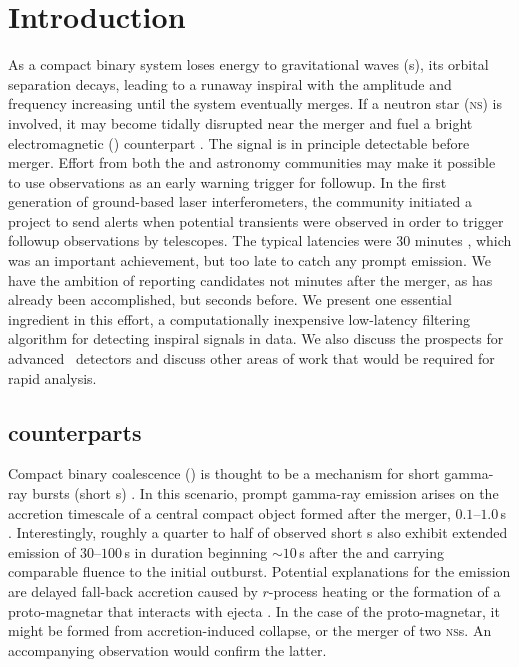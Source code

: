 \section{Introduction}
\label{sec:introduction}

As a compact binary system loses energy to gravitational waves (\GW{}s), its
orbital separation decays, leading to a runaway inspiral with the \GW{}
amplitude and frequency increasing until the system eventually merges.
If a neutron star (\textsc{ns}) is involved, it may become tidally disrupted near
the merger and fuel a bright electromagnetic (\EM{}) counterpart
\citep{shibata:2007}.  The \GW{} signal is in principle detectable
before merger.  Effort from both the \GW{} and astronomy communities may make
it possible to use \GW{} observations as an early warning trigger for \EM{}
followup. In the first generation of ground-based laser interferometers, the \GW{}
community initiated a project to send alerts when potential \GW{} transients
were observed in order to trigger followup observations by \EM{} telescopes.
The typical latencies were 30 minutes \citep{HugheyGWPAW2011}, which was an
important achievement, but too late to catch any prompt \EM{}
emission. We have the ambition of reporting \GW{} candidates not minutes after
the merger, as has already been accomplished, but seconds before.  We present
one essential ingredient in this effort, a computationally inexpensive
low-latency filtering algorithm for detecting inspiral signals in \GW{}
data.  We also discuss the prospects for advanced \GW\ detectors and
discuss other areas of work that would be required for rapid analysis.

\subsection{\EM{} counterparts}

Compact binary coalescence (\CBC) is thought to be a
mechanism for short gamma-ray bursts (short \GRB{}s) \citep{Lee:2005, nakar07}.
In this scenario, prompt gamma-ray emission arises on the accretion timescale
of a central compact object formed after the merger, $0.1$--$1.0$\,s
\citep{Janka1999}.  Interestingly, roughly a quarter to half of observed short
\GRB{}s also exhibit extended emission of $30$--$100$\,s in duration beginning
$\sim$$10$\,s after the \GRB{} and carrying comparable fluence to the initial
outburst.  Potential explanations for the emission are delayed fall-back
accretion caused by $r$-process heating \citep{Metzger2010} or the formation of
a proto-magnetar that interacts with
ejecta \citep{Bucciantini2011}.  In the case of the proto-magnetar, it might be
formed from accretion-induced collapse, or the merger of two \textsc{ns}s.  An
accompanying \GW{} observation would confirm the latter.


